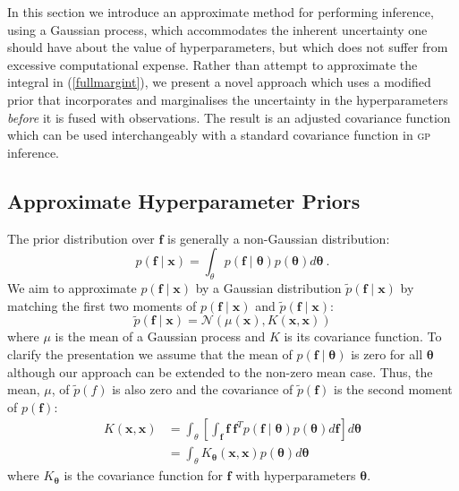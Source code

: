 \documentclass{article}
\begin{document}
In this section we introduce an approximate method for performing inference, using a Gaussian process, which accommodates the inherent uncertainty one should have about the value of hyperparameters, but which does not suffer from excessive computational expense. Rather than attempt to approximate the integral in (\ref{fullmargint}), we present a novel approach which uses a modified prior that incorporates and marginalises the uncertainty in the hyperparameters \emph{before} it is fused with observations. The result is an adjusted covariance function which can be used interchangeably with a standard covariance function in {\scshape gp} inference. %

\subsection{Approximate Hyperparameter Priors}

The prior distribution over $\mathbf{f}$ is generally a non-Gaussian distribution:
\begin{equation}
p(\mathbf{f}\mid \mathbf{x}) = \int_\theta p(\mathbf{f}\mid \bm{\theta}) p(\bm{\theta}) d\bm{\theta}\ .
\end{equation}
We aim to approximate $p(\mathbf{f}\mid \mathbf{x})$ by a Gaussian distribution 
$\tilde{p}(\mathbf{f}\mid \mathbf{x})$ by matching the first two moments of 
$p(\mathbf{f}\mid \mathbf{x})$ and $\tilde{p}(\mathbf{f}\mid \mathbf{x})$:
\begin{equation}
\tilde{p}(\mathbf{f}\mid \mathbf{x})=\mathcal{N}(\mu(\mathbf{x}),K(\mathbf{x},\mathbf{x}))
\end{equation}
where $\mu$ is the mean of a Gaussian process and $K$ is its covariance function.  To clarify the presentation we assume that the mean of $p(\mathbf{f}\mid \bm{\theta})$ is zero for all $\bm{\theta}$ although our approach can be extended to the non-zero mean case.  Thus, the mean, $\mu$, of $\tilde{p}(f)$ is also zero and the covariance of $\tilde{p}(\mathbf{f})$ is the second moment of $p(\mathbf{f})$:
\begin{align}
K(\mathbf{x},\mathbf{x})&=\int_\theta \left[\int_{\mathbf{f}} \mathbf{f}\  \mathbf{f}^T p(\mathbf{f}\mid \bm{\theta}) p(\bm{\theta}) d\mathbf{f} \right] d\bm{\theta}\\
&=\int_\theta K_{\bm{\theta}}(\mathbf{x},\mathbf{x}) p(\bm{\theta}) d\bm{\theta}
\end{align}
where $K_{\bm{\theta}}$ is the covariance function for $\mathbf{f}$ with hyperparameters $\bm{\theta}$.
\end{document}
